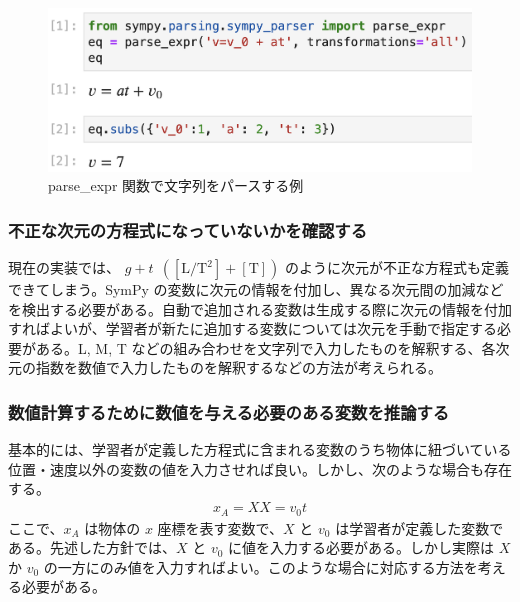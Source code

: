 \begin{figure}[htb]
  \centering
  \includegraphics[width=0.9\linewidth]{work/example_parse.png}
  \caption{parse\_expr 関数で文字列をパースする例} \label{example_parse}
\end{figure}

\subsubsection*{不正な次元の方程式になっていないかを確認する}
現在の実装では、 $g + t~~\mathrm{([L/T^2] + [T])}$ のように次元が不正な方程式も定義できてしまう。SymPy の変数に次元の情報を付加し、異なる次元間の加減などを検出する必要がある。自動で追加される変数は生成する際に次元の情報を付加すればよいが、学習者が新たに追加する変数については次元を手動で指定する必要がある。L, M, T などの組み合わせを文字列で入力したものを解釈する、各次元の指数を数値で入力したものを解釈するなどの方法が考えられる。

\subsubsection*{数値計算するために数値を与える必要のある変数を推論する}
基本的には、学習者が定義した方程式に含まれる変数のうち物体に紐づいている位置・速度以外の変数の値を入力させれば良い。しかし、次のような場合も存在する。
\begin{align*}
x_A = X
X = v_0t
\end{align*}
ここで、$x_A$ は物体の $x$ 座標を表す変数で、$X$ と $v_0$ は学習者が定義した変数である。先述した方針では、$X$ と $v_0$ に値を入力する必要がある。しかし実際は $X$ か $v_0$ の一方にのみ値を入力すればよい。このような場合に対応する方法を考える必要がある。